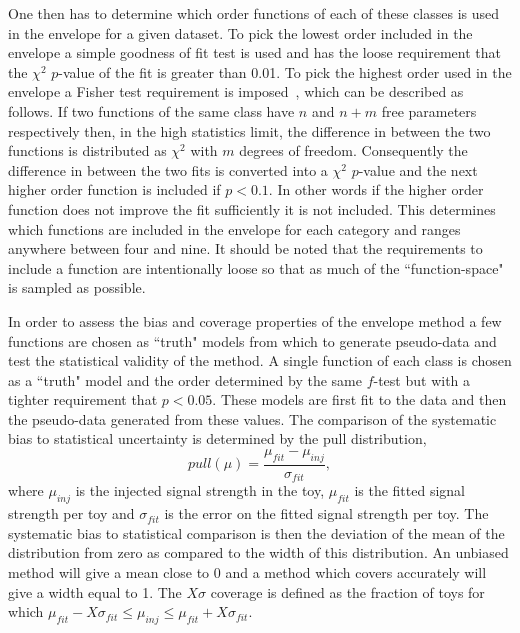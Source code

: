 One then has to determine which order functions of each of these classes is used in the envelope for a given dataset. To pick the lowest order included in the envelope a simple goodness of fit test is used and has the loose requirement that the $\chi^{2}$ $p$-value of the fit is greater than 0.01. To pick the highest order used in the envelope a Fisher test requirement is imposed~\cite{fisher}, which can be described as follows. If two functions of the same class have $n$ and $n+m$ free parameters respectively then, in the high statistics limit, the difference in \NLL between the two functions is distributed as $\chi^{2}$ with $m$ degrees of freedom. Consequently the difference in \NLL between the two fits is converted into a $\chi^{2}$ $p$-value and the next higher order function is included if $p<0.1$. In other words if the higher order function does not improve the fit sufficiently it is not included. This determines which functions are included in the envelope for each category and ranges anywhere between four and nine. It should be noted that the requirements to include a function are intentionally loose so that as much of the ``function-space" is sampled as possible.

In order to assess the bias and coverage properties of the envelope method a few functions are chosen as ``truth" models from which to generate pseudo-data and test the statistical validity of the method. A single function of each class is chosen as a ``truth" model and the order determined by the same $f$-test but with a tighter requirement that $p<0.05$. These models are first fit to the data and then the pseudo-data generated from these values. The comparison of the systematic bias to statistical uncertainty is determined by the pull distribution,
\begin{equation}
  pull(\mu) = \frac{\mu_{fit} - \mu_{inj}}{\sigma_{fit}},
\end{equation}
where $\mu_{inj}$ is the injected signal strength in the toy, $\mu_{fit}$ is the fitted signal strength per toy and $\sigma_{fit}$ is the error on the fitted signal strength per toy. The systematic bias to statistical comparison is then the deviation of the mean of the distribution from zero as compared to the width of this distribution. An unbiased method will give a mean close to 0 and a method which covers accurately will give a width equal to 1. The $X\sigma$ coverage is defined as the fraction of toys for which $\mu_{fit}-X\sigma_{fit}\leq\mu_{inj}\leq\mu_{fit}+X\sigma_{fit}$.

